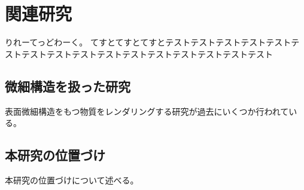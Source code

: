 \chapter{関連研究}
\label{CRelatedWork}

りれーてっどわーく。
てすとてすとてすとテストテストテストテストテストテストテストテストテストテストテストテストテストテストテストテスト

\section{微細構造を扱った研究}
\label{SMicrostructure}

表面微細構造をもつ物質をレンダリングする研究が過去にいくつか行われている。


\section{本研究の位置づけ}
\label{SPosition}

本研究の位置づけについて述べる。
